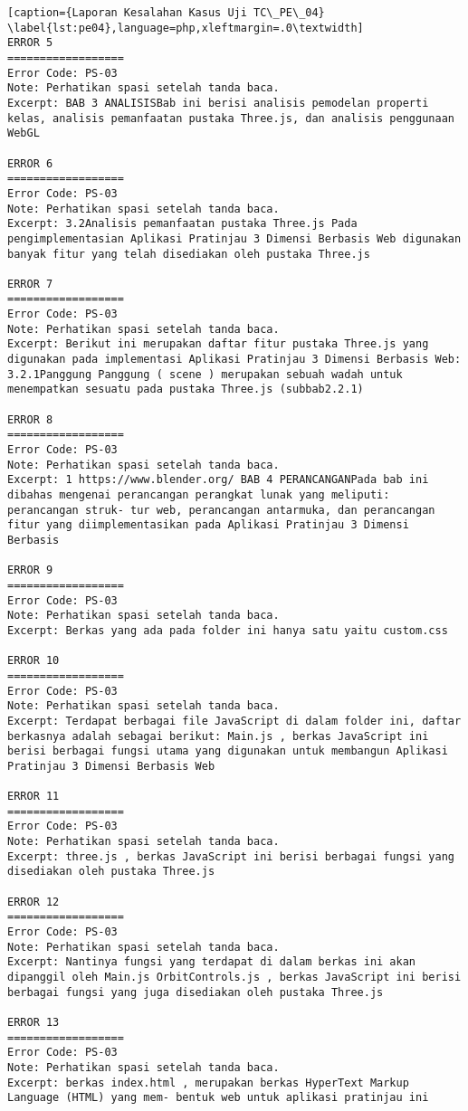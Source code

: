 \begin{enumerate}
\begin{lstlisting}[caption={Laporan Kesalahan Kasus Uji TC\_PE\_04}	\label{lst:pe04},language=php,xleftmargin=.0\textwidth]
ERROR 5
==================
Error Code: PS-03
Note: Perhatikan spasi setelah tanda baca.
Excerpt: BAB 3 ANALISISBab ini berisi analisis pemodelan properti kelas, analisis pemanfaatan pustaka Three.js, dan analisis penggunaan WebGL

ERROR 6
==================
Error Code: PS-03
Note: Perhatikan spasi setelah tanda baca.
Excerpt: 3.2Analisis pemanfaatan pustaka Three.js Pada pengimplementasian Aplikasi Pratinjau 3 Dimensi Berbasis Web digunakan banyak fitur yang telah disediakan oleh pustaka Three.js

ERROR 7
==================
Error Code: PS-03
Note: Perhatikan spasi setelah tanda baca.
Excerpt: Berikut ini merupakan daftar fitur pustaka Three.js yang digunakan pada implementasi Aplikasi Pratinjau 3 Dimensi Berbasis Web: 3.2.1Panggung Panggung ( scene ) merupakan sebuah wadah untuk menempatkan sesuatu pada pustaka Three.js (subbab2.2.1)

ERROR 8
==================
Error Code: PS-03
Note: Perhatikan spasi setelah tanda baca.
Excerpt: 1 https://www.blender.org/ BAB 4 PERANCANGANPada bab ini dibahas mengenai perancangan perangkat lunak yang meliputi: perancangan struk- tur web, perancangan antarmuka, dan perancangan fitur yang diimplementasikan pada Aplikasi Pratinjau 3 Dimensi Berbasis

ERROR 9
==================
Error Code: PS-03
Note: Perhatikan spasi setelah tanda baca.
Excerpt: Berkas yang ada pada folder ini hanya satu yaitu custom.css

ERROR 10
==================
Error Code: PS-03
Note: Perhatikan spasi setelah tanda baca.
Excerpt: Terdapat berbagai file JavaScript di dalam folder ini, daftar berkasnya adalah sebagai berikut: Main.js , berkas JavaScript ini berisi berbagai fungsi utama yang digunakan untuk membangun Aplikasi Pratinjau 3 Dimensi Berbasis Web

ERROR 11
==================
Error Code: PS-03
Note: Perhatikan spasi setelah tanda baca.
Excerpt: three.js , berkas JavaScript ini berisi berbagai fungsi yang disediakan oleh pustaka Three.js

ERROR 12
==================
Error Code: PS-03
Note: Perhatikan spasi setelah tanda baca.
Excerpt: Nantinya fungsi yang terdapat di dalam berkas ini akan dipanggil oleh Main.js OrbitControls.js , berkas JavaScript ini berisi berbagai fungsi yang juga disediakan oleh pustaka Three.js

ERROR 13
==================
Error Code: PS-03
Note: Perhatikan spasi setelah tanda baca.
Excerpt: berkas index.html , merupakan berkas HyperText Markup Language (HTML) yang mem- bentuk web untuk aplikasi pratinjau ini


\end{lstlisting}
\end{enumerate}
